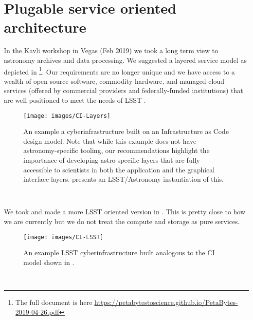 
\section{Plugable service oriented architecture} \label{sec:arc}

In the Kavli workshop in Vegas (Feb 2019) we took a long term view to astronomy archives and data processing.
We suggested a layered service model as depicted in \footnote{The full document is here \url{https://petabytestoscience.github.io/PetaBytes-2019-04-26.pdf}}.
Our requirements are no longer unique and we have access to a wealth of open source \gls{software}, commodity hardware, and managed \gls{cloud} services (offered by commercial providers and federally-funded institutions) that are well positioned to meet the needs of LSST \cite{2019AAS...23345706M, 2019AAS...23324505B}.


\begin{figure}
    \centering
    \texttt{[image: images/CI-Layers]}
    \caption{An example a \gls{cyberinfrastructure} built on an Infrastructure as Code design model. Note that while this example does not have astronomy-specific tooling, our recommendations highlight the importance of developing astro-specific layers that are fully accessible to scientists in both  the application  and the graphical interface layers.  presents an LSST/Astronomy instantiation of this.}
    \label{fig:CI}
\end{figure}\


We took  and made a more LSST oriented version in . This is pretty close to how we are currently but we do not treat the compute and storage as pure services.

\begin{figure}
    \centering
    \texttt{[image: images/CI-LSST]}
    \caption{An example \gls{LSST}  \gls{cyberinfrastructure} built analogous to the \gls{CI} model shown in .}
    \label{fig:CI-LSST}
\end{figure}\




